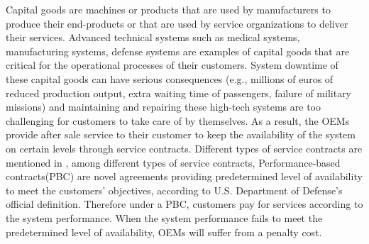 \documentclass[preprint,12pt]{elsarticle}
\begin{document}
Capital goods are machines or products that are used by manufacturers to produce their end-products or that are used by service organizations to deliver their services. Advanced technical systems such as medical systems, manufacturing systems, defense systems are examples of capital goods that are critical for the operational processes of their customers. System downtime of these capital goods can have serious consequences (e.g., millions of euros of reduced production output, extra waiting time of passengers, failure of military missions) and maintaining and repairing these high-tech systems are too challenging for customers to take care of by themselves. As a result, the OEMs provide after sale service to their customer to keep the availability of the system on certain levels through service contracts. Different types of service contracts are mentioned in \citet{Cohen2006}, among different types of service contracts, Performance-based contracts(PBC) are novel agreements providing predetermined level of availability to meet the customers' objectives, according to U.S. Department of Defense's official definition. Therefore under a PBC, customers pay for services according to the system performance. When the system performance fails to meet the predetermined level of availability, OEMs will suffer from a penalty cost.


\end{document}
